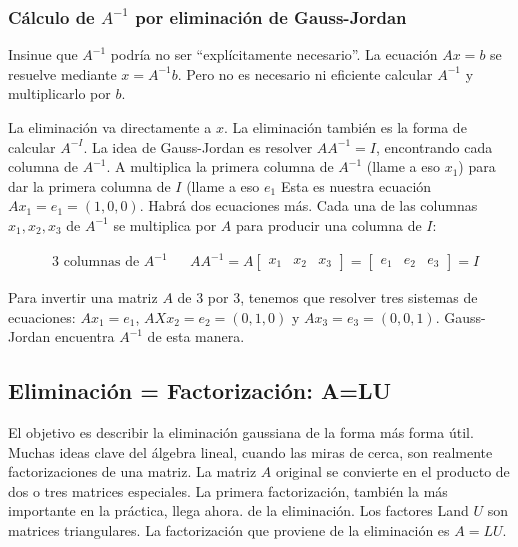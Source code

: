 \subsubsection{Cálculo de $A^{-1}$ por eliminación de Gauss-Jordan}
Insinue que $A^{-1}$ podría no ser ``explícitamente necesario''. La ecuación $Ax = b$ se resuelve mediante
$x =A^{-1}b$. Pero no es necesario ni eficiente calcular $A^{-1}$ y multiplicarlo por $b$.

La eliminación va directamente a $x$. La eliminación también es la forma de calcular $A^{-I}$.
La idea de Gauss-Jordan es resolver $AA^{-1}=I$, encontrando cada columna de $A^{-1}$.
A multiplica la primera columna de $A^{-1}$ (llame a eso $x_1$) para dar la primera columna de $I$ (llame
a eso $e_1$ Esta es nuestra ecuación $Ax_1 = e_1 = (1, 0, 0)$. Habrá dos ecuaciones más.
Cada una de las columnas $x_1, x_2, x_3$ de $A^{-1}$ se multiplica por $A$ para producir una columna de $I$:

\begin{align}
	 & \text{3 columnas de }A^{-1} &  & AA^{-1}=A\begin{bmatrix}
		                                             x_1 & x_2 & x_3
	                                             \end{bmatrix}=\begin{bmatrix}
		                                                           e_1 & e_2 & e_3
	                                                           \end{bmatrix}=I
\end{align}

Para invertir una matriz $A$ de 3 por 3, tenemos que resolver tres sistemas de ecuaciones: $Ax_1=e_1$,
$AXx_2 = e_2 = (0,1,0)$ y $Ax_3 = e_3 = (0,0,1)$. Gauss-Jordan encuentra $A^{-1}$ de esta manera.





\subsection{Eliminación = Factorización: A=LU}

El objetivo es describir la eliminación gaussiana de la forma más
forma útil. Muchas ideas clave del álgebra lineal, cuando las miras de cerca, son realmente
factorizaciones de una matriz. La matriz $A$ original se convierte en el producto de dos o tres
matrices especiales. La primera factorización, también la más importante en la práctica, llega ahora.
de la eliminación. Los factores Land $U$ son matrices triangulares. La factorización que
proviene de la eliminación es $A = L U$.

